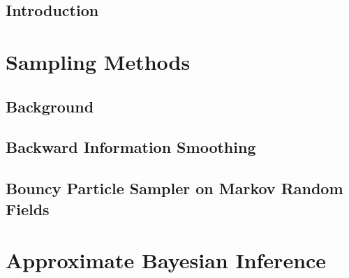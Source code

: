 
\singlespacing
\setcounter{tocdepth}{2}
\setcounter{secnumdepth}{2}
\iftoc\tableofcontents\fi

\cleardoublepage

\thispagestyle{empty}


\raggedbottom



\doublespacing


\chapter{Introduction}\setcounter{page}{1}

\ifintro\fi

\part{Sampling Methods} %

\chapter{\label{chap:BGsampling}Background}

\ifbgs\fi

\chapter{\label{chap:BIS}Backward Information Smoothing}

\iftfs\fi

\chapter{\label{chapBPSMRF}Bouncy Particle Sampler on Markov Random Fields}

\iflbps\fi

\part{Approximate Bayesian Inference} %

